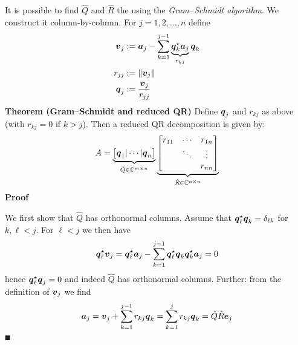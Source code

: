 It is possible to find $\hat Q$ and $\hat R$ the  using the \emph{Gram\ensuremath{\endash}Schmidt algorithm}. We construct it column-by-column. For $j = 1, 2, \ensuremath{\ldots}, n$ define
\begin{align*}
\bm{{\mbox{\boldmath$v$\unboldmath}}}_j &:= \bm{{\mbox{\boldmath$a$\unboldmath}}}_j - \sum_{k=1}^{j-1} \underbrace{\bm{{\mbox{\boldmath$q$\unboldmath}}}_k^\star \bm{{\mbox{\boldmath$a$\unboldmath}}}_j}_{r_{kj}} \bm{{\mbox{\boldmath$q$\unboldmath}}}_k \\
r_{jj} &:= {\|\bm{{\mbox{\boldmath$v$\unboldmath}}}_j\|} \\
\bm{{\mbox{\boldmath$q$\unboldmath}}}_j &:= {\bm{{\mbox{\boldmath$v$\unboldmath}}}_j \over r_{jj}}
\end{align*}
\textbf{Theorem (Gram\ensuremath{\endash}Schmidt and reduced QR)} Define $\bm{{\mbox{\boldmath$q$\unboldmath}}}_j$ and $r_{kj}$ as above (with $r_{kj} = 0$ if $k > j$). Then a reduced QR decomposition is given by:
\[
A = \underbrace{\begin{bmatrix} \ensuremath{\bm{\q}}_1 | \ensuremath{\cdots} | \ensuremath{\bm{\q}}_n \end{bmatrix}}_{ \hat Q \ensuremath{\in} \ensuremath{\bbC}^{m \ensuremath{\times} n}} \underbrace{\begin{bmatrix} r_{11} & \ensuremath{\cdots} & r_{1n} \\ & \ensuremath{\ddots} & \ensuremath{\vdots} \\ && r_{nn}  \end{bmatrix}}_{\hat R \ensuremath{\in} \ensuremath{\bbC}^{n \ensuremath{\times} n}}
\]
\textbf{Proof}

We first show that $\hat Q$ has orthonormal columns. Assume that $\bm{{\mbox{\boldmath$q$\unboldmath}}}_\ell^\star \bm{{\mbox{\boldmath$q$\unboldmath}}}_k = \delta_{\ell k}$ for $k,\ensuremath{\ell} < j$.  For $\ensuremath{\ell} < j$ we then have
\[
\bm{{\mbox{\boldmath$q$\unboldmath}}}_\ell^\star \bm{{\mbox{\boldmath$v$\unboldmath}}}_j = \bm{{\mbox{\boldmath$q$\unboldmath}}}_\ell^\star \bm{{\mbox{\boldmath$a$\unboldmath}}}_j - \sum_{k=1}^{j-1}  \bm{{\mbox{\boldmath$q$\unboldmath}}}_\ell^\star\bm{{\mbox{\boldmath$q$\unboldmath}}}_k \bm{{\mbox{\boldmath$q$\unboldmath}}}_k^\star \bm{{\mbox{\boldmath$a$\unboldmath}}}_j = 0
\]
hence $\bm{{\mbox{\boldmath$q$\unboldmath}}}_\ell^\star \bm{{\mbox{\boldmath$q$\unboldmath}}}_j = 0$ and indeed $\hat Q$ has orthonormal columns. Further: from the definition of $\bm{{\mbox{\boldmath$v$\unboldmath}}}_j$ we find
\[
\bm{{\mbox{\boldmath$a$\unboldmath}}}_j = \bm{{\mbox{\boldmath$v$\unboldmath}}}_j + \sum_{k=1}^{j-1} r_{kj} \bm{{\mbox{\boldmath$q$\unboldmath}}}_k = \sum_{k=1}^j r_{kj} \bm{{\mbox{\boldmath$q$\unboldmath}}}_k  = \hat Q \hat R \bm{{\mbox{\boldmath$e$\unboldmath}}}_j
\]
\ensuremath{\QED}

